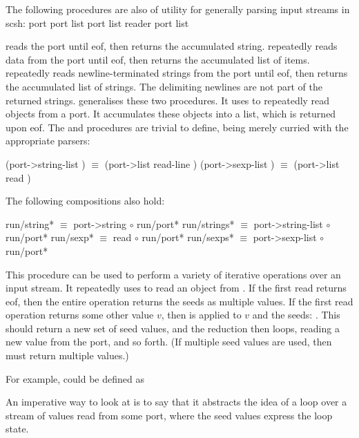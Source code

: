 The following procedures are also of utility for generally parsing 
input streams in scsh:
      {port} {\str}
   {port} {list}
 {port} {{\str} list}
        {reader port} {list}
\begin{desc}
 reads the port until eof,
then returns the accumulated string.
 repeatedly reads data from the port until eof, 
then returns the accumulated list of items.  
 repeatedly reads newline-terminated strings from the
port until eof, then returns the accumulated list of strings.
The delimiting newlines are not part of the returned strings.
 generalises these two procedures.
It uses  to repeatedly read objects from a port.
It accumulates these objects into a list, which is returned upon eof.
The  and  procedures
are trivial to define, being merely  curried with
the appropriate parsers:
\begin{code}\cddollar
(port->string-list ) $\equiv$ (port->list read-line )
(port->sexp-list   ) $\equiv$ (port->list read )\end{code}
%
The following compositions also hold:
\begin{code}\cddollar
run/string*   $\equiv$  port->string      $\circ$ run/port*
run/strings*  $\equiv$  port->string-list $\circ$ run/port*
run/sexp*     $\equiv$  read              $\circ$ run/port*
run/sexps*    $\equiv$  port->sexp-list   $\circ$ run/port*\end{code}
\end{desc}

 {\object\star}
\begin{desc}
This procedure can be used to perform a variety of iterative operations
over an input stream.
It repeatedly uses  to read an object from .
If the first read returns eof, then the entire 
operation returns the seeds as multiple values.
If the first read operation returns some other value $v$, then
 is applied to $v$ and the seeds:
.
This should return a new set of seed values, and the reduction then loops,
reading a new value from the port, and so forth.
(If multiple seed values are used, then  must return multiple values.)

For example, 
could be defined as

An imperative way to look at  is to say that it
abstracts the idea of a loop over a stream of values read from
some port, where the seed values express the loop state.

\end{desc}


